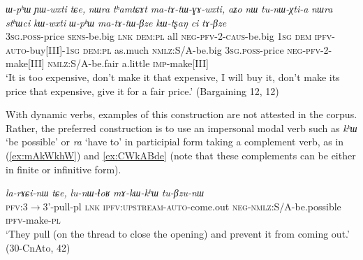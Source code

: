 \documentclass[oneside,a4paper,11pt]{article}
\newcommand{\ipa}[1]{\textit{\phon#1}}
\newcommand{\jpg}[2]{\ipa{#1} `#2'}
\newcommand{\refb}[1]{(\ref{#1})}
\begin{document}
      \begin{exe}
\ex  \label{ex:matAtWGAwxti}
\gll  
   \ipa{ɯ-pʰɯ} 	\ipa{ɲɯ-wxti} 	\ipa{tɕe,} 	\ipa{nɯra} 	\ipa{tʰamtɕɤt} 	\ipa{ma-tɤ-tɯ-ɣɤ-wxti,} 	\ipa{aʑo} 	\ipa{nɯ} 	\ipa{tu-nɯ-χti-a} 	\ipa{nɯra} 	\ipa{stʰɯci} 	\ipa{kɯ-wxti} 	\ipa{ɯ-pʰɯ} 	\ipa{ma-tɤ-tɯ-βze}  \ipa{kɯ-tʂaŋ} 	\ipa{ci} 	\ipa{tɤ-βze} \\
   \textsc{3sg.poss}-price \textsc{sens}-be.big \textsc{lnk} \textsc{dem:pl} all \textsc{neg-pfv-2-caus}-be.big \textsc{1sg} \textsc{dem} \textsc{ipfv-auto}-buy[III]-\textsc{1sg}   \textsc{dem:pl} as.much \textsc{nmlz}:S/A-be.big \textsc{3sg.poss}-price \textsc{neg-pfv-2}-make[III] \textsc{nmlz}:S/A-be.fair a.little \textsc{imp}-make[III] \\
\glt `It is too expensive, don't make it that expensive, I will buy it, don't make its price that expensive, give it for a fair price.' (Bargaining 12,  12)
   \end{exe}


With dynamic verbs, examples of this construction are not attested in the corpus. Rather, the preferred construction is to use an impersonal modal verb such as \jpg{kʰɯ}{be possible} or  \jpg{ra}{have to} in participial form taking a complement verb, as in \refb{ex:mAkWkhW} and \ref{ex:CWkABde} (note that these complements can be either in finite or infinitive form).

 \begin{exe}
\ex  \label{ex:mAkWkhW}
\gll 
\ipa{la-rɤɕi-nɯ} 	\ipa{tɕe,} 	\ipa{lu-nɯ-ɬoʁ} 	\ipa{mɤ-kɯ-kʰɯ} 	\ipa{tu-βzu-nɯ} \\
\textsc{pfv}:3$\rightarrow$3'-pull-pl \textsc{lnk} \textsc{ipfv:upstream-auto}-come.out \textsc{neg-nmlz}:S/A-be.possible \textsc{ipfv}-make-\textsc{pl} \\
\glt `They pull (on the thread to close the opening) and prevent it from coming out.' (30-CnAto, 42)
\end{exe}
   
\end{document}
